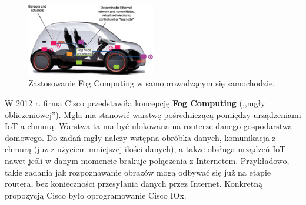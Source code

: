\documentclass[12pt,a4paper,twoside,titlepage,openright]{book}
\begin{document}
\begin{figure}[h]
	\centering
			\includegraphics[width=0.5\textwidth]{fog-samochod.png}
		\caption{Zastosowanie Fog Computing w samoprowadzącym się samochodzie. \cite{fog5g}}
		\label{fig:fog-samochod}
\end{figure}

W 2012 r. firma Cisco przedstawiła koncepcję \textbf{Fog Computing} (,,mgły obliczeniowej''). Mgła ma stanowić warstwę pośredniczącą pomiędzy urządzeniami IoT a chmurą. Warstwa ta ma być ulokowana na routerze danego gospodarstwa domowego. Do zadań mgły należy wstępna obróbka danych, komunikacja z chmurą (już z użyciem mniejszej ilości danych), a także obsługa urządzeń IoT nawet jeśli w danym momencie brakuje połączenia z Internetem. Przykładowo, takie zadania jak rozpoznawanie obrazów mogą odbywać się już na etapie routera, bez konieczności przesyłania danych przez Internet. Konkretną propozycją Cisco było oprogramowanie Cisco IOx. \cite{fogArticle, iotArchitects}
\end{document}
